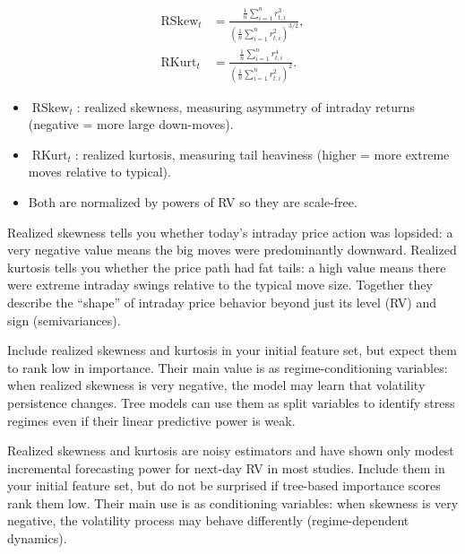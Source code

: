 \begin{align}
\operatorname{RSkew}_t &= \frac{\frac{1}{n}\sum_{i=1}^{n} r_{t,i}^3}{\left(\frac{1}{n}\sum_{i=1}^{n} r_{t,i}^2\right)^{3/2}}, \label{eq:rskew}\\[6pt]
\operatorname{RKurt}_t &= \frac{\frac{1}{n}\sum_{i=1}^{n} r_{t,i}^4}{\left(\frac{1}{n}\sum_{i=1}^{n} r_{t,i}^2\right)^{2}}. \label{eq:rkurt}
\end{align}
\begin{itemize}[nosep]
  \item $\operatorname{RSkew}_t$: realized skewness, measuring asymmetry of intraday returns (negative = more large down-moves).
  \item $\operatorname{RKurt}_t$: realized kurtosis, measuring tail heaviness (higher = more extreme moves relative to typical).
  \item Both are normalized by powers of RV so they are scale-free.
\end{itemize}

\begin{intuition}
Realized skewness tells you whether today's intraday price action was lopsided: a very negative value means the big moves were predominantly downward. Realized kurtosis tells you whether the price path had fat tails: a high value means there were extreme intraday swings relative to the typical move size. Together they describe the ``shape'' of intraday price behavior beyond just its level (RV) and sign (semivariances).
\end{intuition}

\begin{projectconnection}
Include realized skewness and kurtosis in your initial feature set, but expect them to rank low in importance. Their main value is as regime-conditioning variables: when realized skewness is very negative, the model may learn that volatility persistence changes. Tree models can use them as split variables to identify stress regimes even if their linear predictive power is weak.
\end{projectconnection}

\begin{warning}
Realized skewness and kurtosis are noisy estimators and have shown only modest incremental forecasting power for next-day RV in most studies.
Include them in your initial feature set, but do not be surprised if tree-based importance scores rank them low.
Their main use is as conditioning variables: when skewness is very negative, the volatility process may behave differently (regime-dependent dynamics).
\end{warning}

